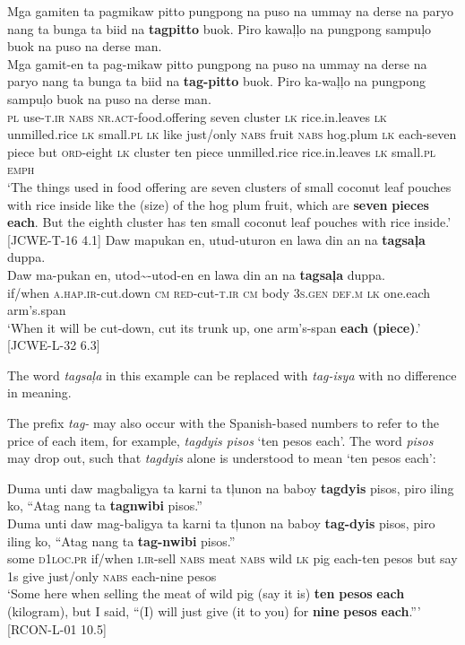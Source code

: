 \ea
Mga  gamiten  ta  pagmikaw  pitto  pungpong  na  puso na  ummay  na  derse  na  paryo  nang  ta  bunga  ta  biid  na \textbf{tagpitto}  buok.  Piro  kawaļļo  na  pungpong  sampuļo  buok na  puso  na  derse  man. \\\smallskip
 \gll Mga  gamit-en  ta  pag-mikaw  pitto  pungpong  na  puso na  ummay  na  derse  na  paryo  nang  ta  bunga  ta  biid  na \textbf{tag-pitto}  buok.  Piro  ka-waļļo  na  pungpong  sampuļo  buok na  puso  na  derse  man. \\
\textsc{pl}  use-\textsc{t.ir}  \textsc{nabs}  \textsc{nr.act}-food.offering  seven  cluster  \textsc{lk}  rice.in.leaves \textsc{lk}  unmilled.rice  \textsc{lk}   small.\textsc{pl}  \textsc{lk}  like  just/only  \textsc{nabs}  fruit  \textsc{nabs}  hog.plum  \textsc{lk}
each-seven  piece  but  \textsc{ord}-eight  \textsc{lk}  cluster  ten  piece
unmilled.rice  rice.in.leaves  \textsc{lk}  small.\textsc{pl}  \textsc{emph} \\
\glt `The things used in food offering are seven clusters of small coconut leaf pouches with rice inside like the (size) of the hog plum fruit, which are \textbf{seven} \textbf{pieces} \textbf{each}. But the eighth cluster has ten small coconut leaf pouches with rice inside.’ [JCWE-T-16 4.1] 
\z
\ea
Daw  mapukan  en,  utud-uturon  en  lawa  din  an na \textbf{tagsaļa}  duppa. \\\smallskip
 \gll Daw  ma-pukan  en,  utod\sim{}-utod-en  en  lawa  din  an na \textbf{tagsaļa}  duppa. \\
if/when  \textsc{a.hap.ir}-cut.down  \textsc{cm}  \textsc{red}-cut-\textsc{t.ir}  \textsc{cm}  body  3\textsc{s.gen}  \textsc{def.m} \textsc{lk} one.each  arm’s.span \\
\glt `When it will be cut-down, cut its trunk up, one arm’s-span \textbf{each} \textbf{(piece)}.' [JCWE-L-32 6.3]
\z

The word \textit{tagsaļa} in this example can be replaced with \textit{tag-isya} with no difference in meaning.

The prefix \textit{tag-} may also occur with the Spanish-based numbers to refer to the price of each item, for example, \textit{tagdyis pisos} ‘ten pesos each’. The word \textit{pisos} may drop out, such that \textit{tagdyis} alone is understood to mean ‘ten pesos each’:

\ea
Duma  unti  daw  magbaligya  ta  karni  ta  tļunon  na  baboy \textbf{tagdyis}  pisos,  piro  iling  ko,  “Atag  nang  ta  \textbf{tagnwibi}  pisos.” \\\smallskip
 \gll Duma  unti  daw  mag-baligya  ta  karni  ta  tļunon  na  baboy \textbf{tag-dyis}  pisos,  piro  iling  ko,  “Atag  nang  ta  \textbf{tag-nwibi}  pisos.” \\
some  \textsc{d}1\textsc{loc.pr}  if/when  \textsc{i.ir}-sell  \textsc{nabs}  meat  \textsc{nabs}  wild  \textsc{lk}  pig each-ten  pesos  but  say  1s  give  just/only  \textsc{nabs}  each-nine  pesos \\
\glt `Some here when selling the meat of wild pig (say it is) \textbf{ten} \textbf{pesos} \textbf{each} (kilogram), but I said, “(I) will just give (it to you) for \textbf{nine} \textbf{pesos} \textbf{each}.”' [RCON-L-01 10.5]
\z

